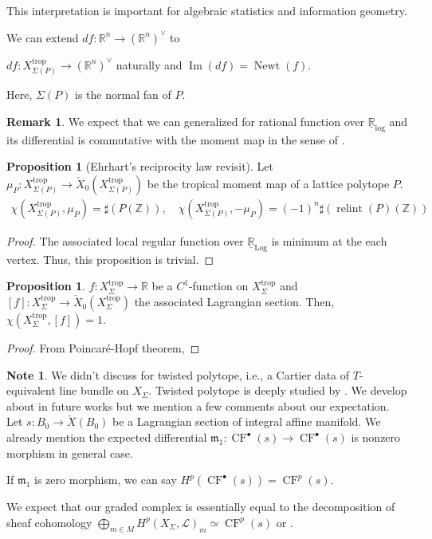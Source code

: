 \documentclass[a4paper,dvipdfmx,reqno,12pt]{amsart}
\theoremstyle{definition}
\newtheorem{Prop}[Thm]{Proposition}
\newtheorem{Note}[Thm]{Note}
\newtheorem{Rmk}[Thm]{Remark}
\newcommand{\R}{\mathbb{R}}%
\newcommand{\Z}{\mathbb{Z}}%
\newcommand{\mcal}[1]{\mathcal{#1}}%
\newcommand{\mf}[1]{\mathfrak{#1}}%
\newcommand{\opn}[1]{\operatorname{#1}}
\numberwithin{equation}{section}
\begin{document}
This interpretation is important for algebraic statistics
and information geometry.

We can extend $df: \R^{n}\to (\R^{n})^{\vee}$ to

$df:X_{\Sigma(P)}^{\opn{trop}}\to (\R^{n})^{\vee}$ naturally and
$\opn{Im}(df)=\opn{Newt}(f)$.

Here, $\Sigma(P)$ is the normal fan of $P$.







\begin{Rmk}
  We expect that we can generalized for rational function
  over $\underline{\R}_{\opn{log}}$ and its differential is
  commutative with the moment map in the sense of .
\end{Rmk}

\begin{Prop}[Ehrhart's reciprocity law revisit]
  Let $\mu_P: X_{\Sigma (P)}^{\opn{trop}}
    \to \check{X}_0(X_{\Sigma (P)}^{\opn{trop}})$
  be the tropical moment map of a lattice polytope $P$.
  \begin{align}
    \chi(X_{\Sigma(P)}^{\opn{trop}},\mu_P)=\sharp (P(\Z)),
    \quad \chi(X_{\Sigma(P)}^{\opn{trop}},-\mu_P)=(-1)^{n}\sharp (\opn{relint}(P)(\Z))
  \end{align}
\end{Prop}
\begin{proof}
  The associated local regular function over $\underline{\R}_{\opn{Log}}$ is minimum at the each vertex.
  Thus, this proposition is trivial.
\end{proof}


\begin{Prop}
  $f:X_{\Sigma}^{\opn{trop}}\to \R$ be a $C^{1}$-function on $X_{\Sigma}^{\opn{trop}}$ and $[f]:X_{\Sigma}^{\opn{trop}} \to \check{X}_0(X_{\Sigma}^{\opn{trop}})$ the associated Lagrangian section.
  Then, $\chi(X_{\Sigma}^{\opn{trop}},[f])=1$.
\end{Prop}
\begin{proof}
  From Poincar\'e-Hopf theorem,
\end{proof}

\begin{Note}
  We didn't discuss for twisted polytope, i.e., a Cartier data of $T$-equivalent line bundle on $X_{\Sigma}$.
  Twisted polytope is deeply studied by \cite{MR1243782}.
  We develop about in future works but we mention a few comments about our expectation.
  Let $s:B_0 \to \check{X}(B_0)$ be a Lagrangian section of integral affine manifold.
  We already mention the expected differential $\mf{m}_1: \opn{CF}^{\bullet}(s)\to \opn{CF}^{\bullet}(s)$ is nonzero morphism in general case.

  If $\mf{m}_1$ is zero morphism, we can say $H^{p}(\opn{CF}^{\bullet}(s))=\opn{CF}^{p}(s)$.

  We expect that our graded complex is essentially
  equal to the decomposition of sheaf cohomology
  $\bigoplus_{m\in M}H^{p}(X_{\Sigma},\mcal{L})_m\simeq \opn{CF}^{p}(s)$ \cite[Theorem 9.1.3]{coxToricVarieties2011a}
  or \cite{MR1243782}.


\end{Note}
\end{document}
